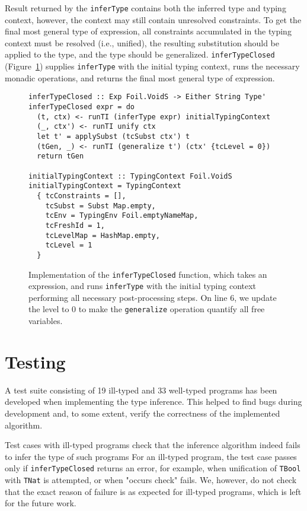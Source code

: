 Result returned by the \texttt{inferType} contains both the inferred type and typing context, however, the context may still contain unresolved constraints. To get the final most general type of expression, all constraints accumulated in the typing context must be resolved (i.e., unified), the resulting substitution should be applied to the type, and the type should be generalized. \texttt{inferTypeClosed} (Figure~\ref{fig:inferTypeClosed}) supplies \texttt{inferType} with the initial typing context, runs the necessary monadic operations, and returns the final most general type of expression.

\begin{figure}[H]
\begin{verbatim}
inferTypeClosed :: Exp Foil.VoidS -> Either String Type'
inferTypeClosed expr = do
  (t, ctx) <- runTI (inferType expr) initialTypingContext
  (_, ctx') <- runTI unify ctx
  let t' = applySubst (tcSubst ctx') t
  (tGen, _) <- runTI (generalize t') (ctx' {tcLevel = 0})
  return tGen

initialTypingContext :: TypingContext Foil.VoidS
initialTypingContext = TypingContext
  { tcConstraints = [],
    tcSubst = Subst Map.empty,
    tcEnv = TypingEnv Foil.emptyNameMap,
    tcFreshId = 1,
    tcLevelMap = HashMap.empty,
    tcLevel = 1
  }
\end{verbatim}
  \caption[Implementation of \texttt{inferTypeClosed}]{Implementation of the \texttt{inferTypeClosed} function, which takes an expression, and runs \texttt{inferType} with the initial typing context performing all necessary post-processing steps. On line 6, we update the level to 0 to make the \texttt{generalize} operation quantify all free variables.}
  \label{fig:inferTypeClosed}
\end{figure}

\section{Testing}

A test suite consisting of 19 ill-typed and 33 well-typed programs has been developed when implementing the type inference. This helped to find bugs during development and, to some extent, verify the correctness of the implemented algorithm.

Test cases with ill-typed programs check that the inference algorithm indeed fails to infer the type of such programs For an ill-typed program, the test case passes only if \texttt{inferTypeClosed} returns an error, for example, when unification of \texttt{TBool} with \texttt{TNat} is attempted, or when "occurs check" fails. We, however, do not check that the exact reason of failure is as expected for ill-typed programs, which is left for the future work.

